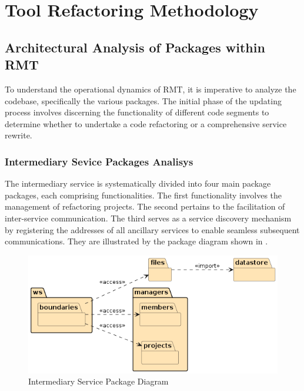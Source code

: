 \chapter{Tool Refactoring Methodology}%
\label{methodology}

\section{Architectural Analysis of Packages within RMT}

To understand the operational dynamics of RMT, it is imperative to analyze the codebase, specifically the various packages. The initial phase of the updating process involves discerning the functionality of different code segments to determine whether to undertake a code refactoring or a comprehensive service rewrite.

\subsection{Intermediary Sevice Packages Analisys}
The intermediary service is systematically divided into four main package packages, each comprising functionalities. The first functionality involves the management of refactoring projects. The second pertains to the facilitation of inter-service communication. The third serves as a service discovery mechanism by registering the addresses of all ancillary services to enable seamless subsequent communications. They are illustrated by the package diagram shown in .

\begin{figure}[ht!]
\SetCaptionWidth{\textwidth}
\caption{Intermediary Service Package Diagram}
\label{fig-package-intermediary}
\includegraphics[width =\textwidth, scale=0.2]{Chapter-4/Figures/intermediary-service.png}
\end{figure}
\FloatBarrier

